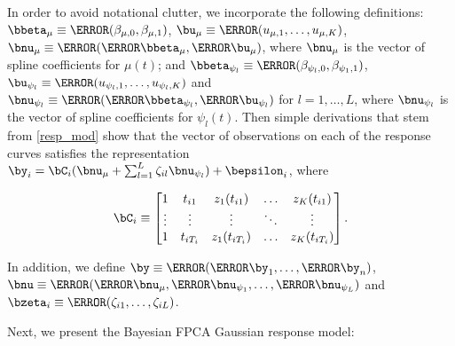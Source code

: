 \documentclass[12pt]{article}
\def\betamu{\bbeta_\mu}
\def\umu{\bu_\mu}
\def\numu{\bnu_\mu}
\newcommand\betapsi[1]{\bbeta_{\psi_{#1}}}
\newcommand\upsi[1]{\bu_{\psi_{#1}}}
\newcommand\nupsi[1]{\bnu_{\psi_{#1}}}
\theoremstyle{plain}
\theoremstyle{definition}
\theoremstyle{remark}
\begin{document}
In order to avoid notational clutter, we incorporate the following definitions:
$\betamu \equiv \T{(\beta_{\mu, 0}, \beta_{\mu, 1})}$, $\umu \equiv \T{(u_{\mu, 1}, \dots, u_{\mu, K})}$,
$\numu \equiv \T{(\T{\betamu}, \T{\umu})}$, where $\numu$ is the vector of spline coefficients for $\mu (t)$;
and $\betapsi{l} \equiv \T{(\beta_{\psi_l, 0}, \beta_{\psi_1, 1})}$,
$\upsi{l} \equiv \T{(u_{\psi_l, 1}, \dots, u_{\psi_l, K})}$ and $\nupsi{l} \equiv \T{(\T{\betapsi{l}}, \T{\upsi{l}})}$
for $l = 1, \dots, L$, where $\nupsi{l}$ is the vector of spline coefficients for $\psi_l (t)$.
Then simple derivations that stem from \eqref{resp_mod} show that the vector of observations on
each of the response curves satisfies the representation $\by_i = \bC_i (\numu + \sum_{l=1}^L \zeta_{il} \nupsi{l}) +
\bepsilon_{i}$, where

\begin{equation}
	\bC_i \equiv \begin{bmatrix}
		1 & t_{i1} & z_1 (t_{i1}) & \dots & z_K (t_{i1}) \\
		\vdots & \vdots & \vdots & \ddots & \vdots \\
		1 & t_{iT_i} & z_1 (t_{iT_i}) & \dots & z_K (t_{iT_i})
	\end{bmatrix}.
\label{C_mat}
\end{equation}

\noindent In addition, we define $\by \equiv \T{(\T{\by_1}, \dots, \T{\by_n})}$, $\bnu \equiv \T{(\T{\numu}, \T{\nupsi{1}},
\dots, \T{\nupsi{L}})}$ and $\bzeta_i \equiv \T{(\zeta_{i1}, \dots, \zeta_{iL})}$.

Next, we present the Bayesian FPCA Gaussian response model:
\end{document}

